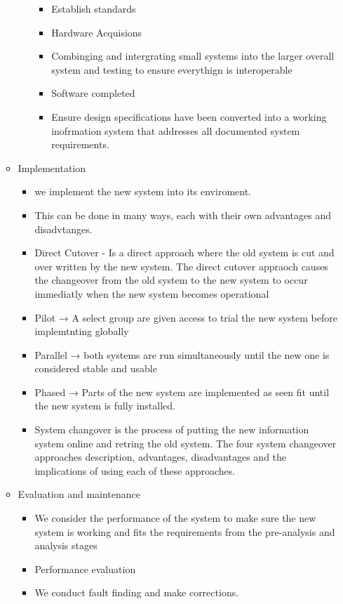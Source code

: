 \documentclass[12pt, a4, twoside]{article}
\begin{document}
\begin{itemize}
\begin{itemize}
\begin{itemize}
        \begin{itemize}
          \item Establish standards
          \item Hardware Acquisions
          \item Combinging and intergrating small systems into the larger overall system and testing to ensure everythign is interoperable
          \item Software completed
          \item Ensure design specifications have been converted into a working inofrmation system that addresses all documented system requirements.
        \end{itemize}
      \end{itemize}
      \item Implementation
      \begin{itemize}
        \item we implement the new system into its enviroment.
        \item This can be done in many ways, each with their own advantages and disadvtanges.
        \item Direct Cutover - Is a direct approach where the old system is cut and over written by the new system. The direct cutover appraoch causes the changeover from the old system to the new system to occur immediatly when the new system becomes operational
        \item Pilot → A select group are given access to trial the new system before implemtnting globally
        \item Parallel → both systems are run simultaneously until the new one is considered stable and usable
        \item Phased → Parts of the new system are implemented as seen fit until the new system is fully installed.
        \item System changover is the process of putting the new information system online and retring the old system. The four system changeover approaches description, advantages, disadvantages and the implications of using each of these approaches.
      \end{itemize}
      \item Evaluation and maintenance
      \begin{itemize}
        \item We consider the performance of the system to make sure the new system is working and fits the requirements from the pre-analysis and analysis stages
        \item Performance evaluation
        \item We conduct fault finding and make corrections.
      \end{itemize}
    \end{itemize}
  \end{itemize}
\end{document}

